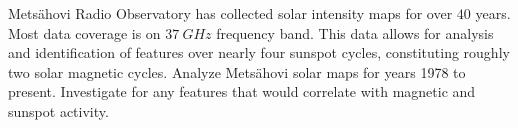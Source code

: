 \documentclass{aa}
\begin{document}
  \abstract
   {Mets\"ahovi Radio Observatory has collected solar intensity maps for over $40$ years. Most data coverage is on $\SI{37}{GHz}$
   frequency band.
   This
   data allows 
   for analysis and identification of features over nearly four sunspot cycles, constituting roughly two solar magnetic cycles.
   }
   {Analyze Metsähovi solar maps for years 1978 to present. Investigate for any features that would correlate with magnetic and sunspot activity.}
\end{document}
